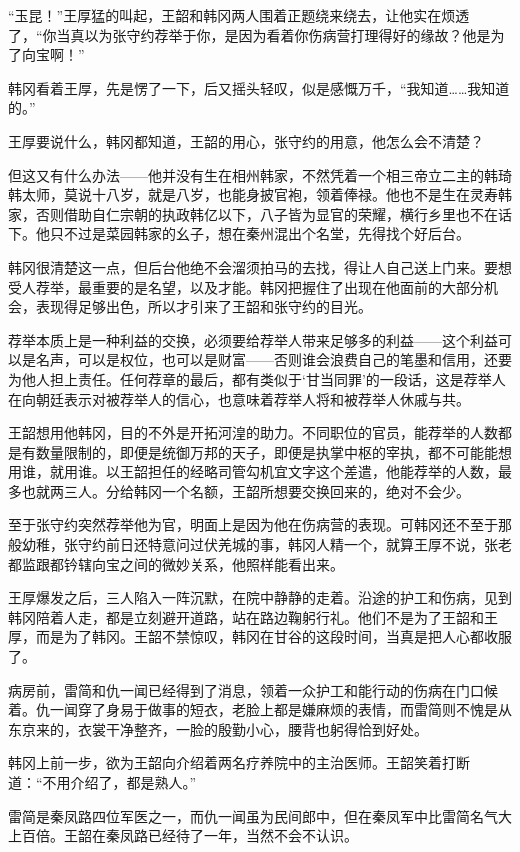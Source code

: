 “玉昆！”王厚猛的叫起，王韶和韩冈两人围着正题绕来绕去，让他实在烦透了，“你当真以为张守约荐举于你，是因为看着你伤病营打理得好的缘故？他是为了向宝啊！”

韩冈看着王厚，先是愣了一下，后又摇头轻叹，似是感慨万千，“我知道……我知道的。”

王厚要说什么，韩冈都知道，王韶的用心，张守约的用意，他怎么会不清楚？

但这又有什么办法——他并没有生在相州韩家，不然凭着一个相三帝立二主的韩琦韩太师，莫说十八岁，就是八岁，也能身披官袍，领着俸禄。他也不是生在灵寿韩家，否则借助自仁宗朝的执政韩亿以下，八子皆为显官的荣耀，横行乡里也不在话下。他只不过是菜园韩家的幺子，想在秦州混出个名堂，先得找个好后台。

韩冈很清楚这一点，但后台他绝不会溜须拍马的去找，得让人自己送上门来。要想受人荐举，最重要的是名望，以及才能。韩冈把握住了出现在他面前的大部分机会，表现得足够出色，所以才引来了王韶和张守约的目光。

荐举本质上是一种利益的交换，必须要给荐举人带来足够多的利益——这个利益可以是名声，可以是权位，也可以是财富——否则谁会浪费自己的笔墨和信用，还要为他人担上责任。任何荐章的最后，都有类似于‘甘当同罪’的一段话，这是荐举人在向朝廷表示对被荐举人的信心，也意味着荐举人将和被荐举人休戚与共。

王韶想用他韩冈，目的不外是开拓河湟的助力。不同职位的官员，能荐举的人数都是有数量限制的，即便是统御万邦的天子，即便是执掌中枢的宰执，都不可能能想用谁，就用谁。以王韶担任的经略司管勾机宜文字这个差遣，他能荐举的人数，最多也就两三人。分给韩冈一个名额，王韶所想要交换回来的，绝对不会少。

至于张守约突然荐举他为官，明面上是因为他在伤病营的表现。可韩冈还不至于那般幼稚，张守约前日还特意问过伏羌城的事，韩冈人精一个，就算王厚不说，张老都监跟都钤辖向宝之间的微妙关系，他照样能看出来。

王厚爆发之后，三人陷入一阵沉默，在院中静静的走着。沿途的护工和伤病，见到韩冈陪着人走，都是立刻避开道路，站在路边鞠躬行礼。他们不是为了王韶和王厚，而是为了韩冈。王韶不禁惊叹，韩冈在甘谷的这段时间，当真是把人心都收服了。

病房前，雷简和仇一闻已经得到了消息，领着一众护工和能行动的伤病在门口候着。仇一闻穿了身易于做事的短衣，老脸上都是嫌麻烦的表情，而雷简则不愧是从东京来的，衣裳干净整齐，一脸的殷勤小心，腰背也躬得恰到好处。

韩冈上前一步，欲为王韶向介绍着两名疗养院中的主治医师。王韶笑着打断道：“不用介绍了，都是熟人。”

雷简是秦凤路四位军医之一，而仇一闻虽为民间郎中，但在秦凤军中比雷简名气大上百倍。王韶在秦凤路已经待了一年，当然不会不认识。

